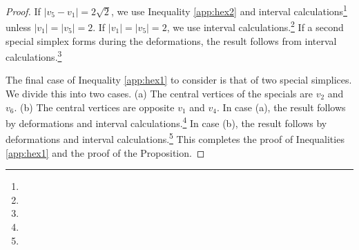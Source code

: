 \begin{proof}

If $|v_5-v_1|=2\sqrt2$, we use Inequality \ref{app:hex2} and
interval calculations\footnote{} %
unless $|v_1|=|v_5|=2$. If $|v_1|=|v_5|=2$, we use  interval
calculations.\footnote{} %
If a second special simplex forms during the deformations, the
result follows from interval calculations.\footnote{} %

The final case of Inequality \ref{app:hex1}  to consider is that
of two special simplices. We divide this into two cases. (a) The
central vertices of the specials are $v_2$ and $v_6$.  (b) The
central vertices are opposite $v_1$ and $v_4$. In case (a), the
result follows by deformations and interval calculations.\footnote{} %
In case (b), the result follows by deformations and interval
calculations.\footnote{} %
This completes the proof of
Inequalities \ref{app:hex1} and the proof of the Proposition.
\end{proof}
